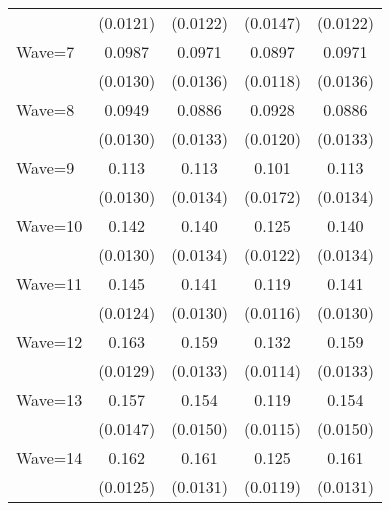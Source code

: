 {\begin{tabular}{l*{4}{c}}
                    &    (0.0121)         &    (0.0122)         &    (0.0147)         &    (0.0122)         \\
[1em]
Wave=7              &      0.0987\sym{***}&      0.0971\sym{***}&      0.0897\sym{***}&      0.0971\sym{***}\\
                    &    (0.0130)         &    (0.0136)         &    (0.0118)         &    (0.0136)         \\
[1em]
Wave=8              &      0.0949\sym{***}&      0.0886\sym{***}&      0.0928\sym{***}&      0.0886\sym{***}\\
                    &    (0.0130)         &    (0.0133)         &    (0.0120)         &    (0.0133)         \\
[1em]
Wave=9              &       0.113\sym{***}&       0.113\sym{***}&       0.101\sym{***}&       0.113\sym{***}\\
                    &    (0.0130)         &    (0.0134)         &    (0.0172)         &    (0.0134)         \\
[1em]
Wave=10             &       0.142\sym{***}&       0.140\sym{***}&       0.125\sym{***}&       0.140\sym{***}\\
                    &    (0.0130)         &    (0.0134)         &    (0.0122)         &    (0.0134)         \\
[1em]
Wave=11             &       0.145\sym{***}&       0.141\sym{***}&       0.119\sym{***}&       0.141\sym{***}\\
                    &    (0.0124)         &    (0.0130)         &    (0.0116)         &    (0.0130)         \\
[1em]
Wave=12             &       0.163\sym{***}&       0.159\sym{***}&       0.132\sym{***}&       0.159\sym{***}\\
                    &    (0.0129)         &    (0.0133)         &    (0.0114)         &    (0.0133)         \\
[1em]
Wave=13             &       0.157\sym{***}&       0.154\sym{***}&       0.119\sym{***}&       0.154\sym{***}\\
                    &    (0.0147)         &    (0.0150)         &    (0.0115)         &    (0.0150)         \\
[1em]
Wave=14             &       0.162\sym{***}&       0.161\sym{***}&       0.125\sym{***}&       0.161\sym{***}\\
                    &    (0.0125)         &    (0.0131)         &    (0.0119)         &    (0.0131)         \\

\end{tabular}}
